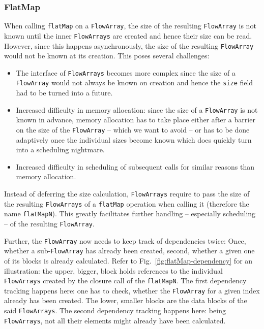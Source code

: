 \documentclass[runningheads,a4paper,fleqn]{llncs}
\begin{document}
\subsubsection{FlatMap}
\label{sssec:flatMapN}

When calling \texttt{flatMap} on a \texttt{FlowArray}, the size of the
resulting \texttt{FlowArray} is not known until the inner \texttt{FlowArrays} are
created and hence their size can be read. However, since this happens 
asynchronously, the size of the resulting \texttt{FlowArray} would not be known
at its creation. This poses several challenges:

\begin{itemize}
\item The interface of \texttt{FlowArrays} becomes more complex since the size
  of a \texttt{FlowArray} would not always be known on creation and hence the
  \texttt{size} field had to be turned into a future.
\item Increased difficulty in memory allocation: since the size of a
  \texttt{FlowArray} is not known in advance, memory allocation has to take
  place either after a barrier on the size of the \texttt{FlowArray} -- which
  we want to avoid -- or has to be done adaptively once the individual
  sizes become known which does quickly turn into a scheduling
  nightmare. 
\item Increased difficulty in scheduling of subsequent calls for
  similar reasons than memory allocation.
\end{itemize}

Instead of deferring the size calculation, \texttt{FlowArrays} require to pass
the size of the resulting \texttt{FlowArrays} of a \texttt{flatMap} operation
when calling it (therefore the name \texttt{flatMapN}). This greatly 
facilitates further handling -- especially scheduling -- of the
resulting \texttt{FlowArray}.

Further, the \texttt{FlowArray} now needs to keep track of dependencies twice:
Once, whether a sub-\texttt{FlowArray} has already been created, second,
whether a given one of its blocks is already calculated. Refer to
Fig.~\ref{fig:flatMap-dependency} for an illustration: the upper,
bigger, block holds references to the individual \texttt{FlowArrays} created by
the closure call of the \texttt{flatMapN}. The first dependency
tracking happens here: one has to check, whether the \texttt{FlowArray} for a
given index already has been created. The lower, smaller blocks are
the data blocks of the said \texttt{FlowArrays}. The second dependency tracking
happens here: being \texttt{FlowArrays}, not all their elements might already
have been calculated.
\end{document}

